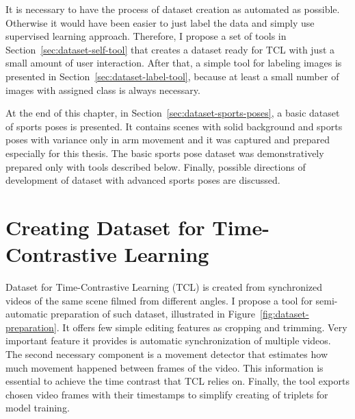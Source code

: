 It is necessary to have the process of dataset creation as automated as possible. Other\-wise it would have been easier to just label the data and simply use supervised learning approach. Therefore, I propose a set of tools in Section~\ref{sec:dataset-self-tool} that creates a dataset ready for TCL with just a small amount of user interaction. After that, a simple tool for labeling images is presented in Section~\ref{sec:dataset-label-tool}, because at least a small number of images with assigned class is always necessary.

At the end of this chapter, in Section~\ref{sec:dataset-sports-poses}, a basic dataset of sports poses is presented. It contains scenes with solid background and sports poses with variance only in arm movement and it was captured and prepared especially for this thesis. The basic sports pose dataset was demonstratively prepared only with tools described below. Finally, possible directions of development of dataset with advanced sports poses are discussed.

\section{\label{sec:dataset-self-tool}Creating Dataset for Time-Contrastive Learning}

Dataset for Time-Contrastive Learning (TCL) is created from synchronized videos of the same scene filmed from different angles. I propose a tool for semi-automatic preparation of such dataset, illustrated in Figure~\ref{fig:dataset-preparation}. It offers few simple editing features as cropping and trimming. Very important feature it provides is automatic synchronization of multiple videos. The second necessary component is a movement detector that estimates how much movement happened between frames of the video. This information is essential to achieve the time contrast that TCL relies on. Finally, the tool exports chosen video frames with their timestamps to simplify creating of triplets for model training.

